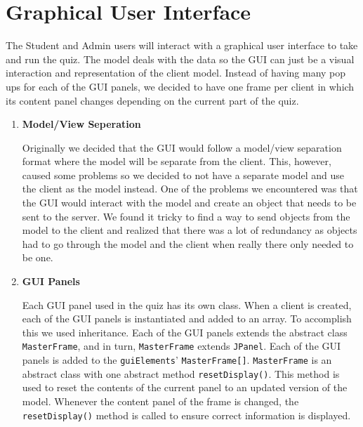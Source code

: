 \section{Graphical User Interface}
\label{sec:graphical_user_interface}

The Student and Admin users will interact with a graphical user interface to
take and run the quiz. The model deals with the data so the GUI can just be a
visual interaction and representation of the client model. Instead of having
many pop ups for each of the GUI panels, we decided to have one frame per
client in which its content panel changes depending on the current part of the
quiz.

\begin{enumerate}

    \item \textbf{Model/View Seperation}

        Originally we decided that the GUI would follow a model/view separation
        format where the model will be separate from the client. This, however,
        caused some problems so we decided to not have a separate model and use
        the client as the model instead. One of the problems we encountered was
        that the GUI would interact with the model and create an object that
        needs to be sent to the server. We found it tricky to find a way to
        send objects from the model to the client and realized that there was a
        lot of redundancy as objects had to go through the model and the client
        when really there only needed to be one.

    \item \textbf{GUI Panels}

        Each GUI panel used in the quiz has its own class.  When a client is
        created, each of the GUI panels is instantiated and added to an array.
        To accomplish this we used inheritance. Each of the GUI panels extends
        the abstract class \texttt{MasterFrame}, and in turn,
        \texttt{MasterFrame} extends \texttt{JPanel}.  Each of the GUI panels
        is added to the \texttt{guiElements}' \texttt{MasterFrame[]}.
        \texttt{MasterFrame} is an abstract class with one abstract method
        \verb+resetDisplay()+.  This method is used to reset the contents of
        the current panel to an updated version of the model.  Whenever the
        content panel of the frame is changed, the \verb+resetDisplay()+ method
        is called to ensure correct information is displayed.


\end{enumerate}
